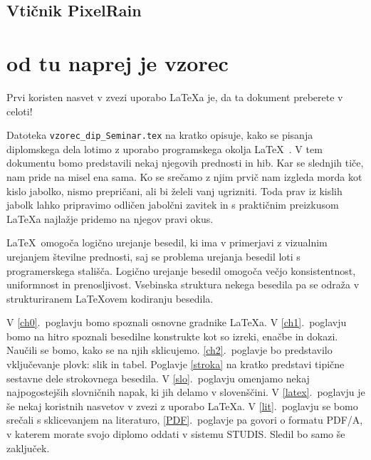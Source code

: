 \documentclass[a4paper, 12pt]{book}
\begin{document}



\section{Vtičnik PixelRain}




\chapter{od tu naprej je vzorec}

Prvi koristen nasvet v zvezi uporabo \LaTeX{a} je, da ta dokument preberete v celoti!

Datoteka {\tt vzorec\_dip\_Seminar.tex} na kratko opisuje, kako se pisanja diplomskega dela lotimo z uporabo programskega okolja \LaTeX~\cite{lamport,nenajkrajsi}. 
V tem dokumentu bomo predstavili nekaj njegovih prednosti in hib. Kar se slednjih tiče, nam pride na misel ena sama. 
Ko se srečamo z njim prvič nam izgleda morda kot kislo jabolko, nismo prepričani, ali bi želeli vanj ugrizniti. 
Toda prav iz kislih jabolk lahko pripravimo odličen jabolčni zavitek in s praktičnim preizkusom \LaTeX a najlažje pridemo na njegov pravi okus.

\LaTeX\ omogoča logično urejanje besedil, ki ima v primerjavi z vizualnim urejanjem številne prednosti, saj se problema urejanja besedil loti s programerskega stališča.
Logično urejanje besedil omogoča večjo konsistentnost, uniformnost in  prenosljivost. Vsebinska struktura nekega besedila pa se odraža v strukturiranem \LaTeX ovem kodiranju besedila.

V \ref{ch0}.~poglavju bomo spoznali osnovne gradnike \LaTeX{a}.
V \ref{ch1}.~poglavju bomo na hitro spoznali besedilne konstrukte kot so izreki, enačbe in dokazi. 
Naučili se bomo, kako se na njih sklicujemo. 
\ref{ch2}.~poglavje bo predstavilo vključevanje plovk: slik in tabel. 
Poglavje \ref{stroka} na kratko predstavi tipične sestavne dele strokovnega besedila.
V \ref{slo}.~poglavju omenjamo nekaj najpogostejših slovničnih napak, ki jih delamo v slovenščini.
V \ref{latex}.~poglavju je še nekaj koristnih nasvetov v zvezi z uporabo \LaTeX{a}.
V \ref{lit}.~poglavju se bomo srečali s sklicevanjem na literaturo,
\ref{PDF}.~poglavje pa govori o formatu PDF/A, v katerem morate svojo diplomo oddati v sistemu STUDIS.
Sledil bo samo še zaključek.
\end{document}
